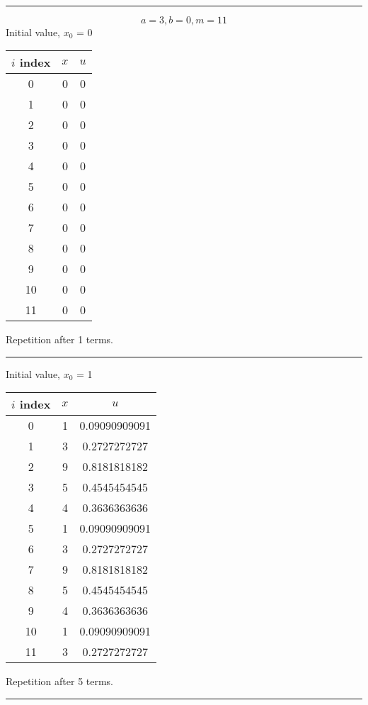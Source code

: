 \documentclass{article}
\begin{document}
\\ \noindent\rule[0.5ex]{\linewidth}{1pt}
\pagebreak
$$a = 3, b = 0, m = 11$$
Initial value, $x_0$ = 0
\begin{center} \begin{tabular}{||c | c | c||}  \hline
		$i$ index & $x$ & $u$ \\ [0.5ex] \hline \hline0 & 0 & 0\\
		\hline 
		1 & 0 & 0\\
		\hline 
		2 & 0 & 0\\
		\hline 
		3 & 0 & 0\\
		\hline 
		4 & 0 & 0\\
		\hline 
		5 & 0 & 0\\
		\hline 
		6 & 0 & 0\\
		\hline 
		7 & 0 & 0\\
		\hline 
		8 & 0 & 0\\
		\hline 
		9 & 0 & 0\\
		\hline 
		10 & 0 & 0\\
		\hline 
		11 & 0 & 0\\
		\hline 
	\end{tabular} 
\end{center} Repetition after 1 terms.
\\ \noindent\rule[0.5ex]{\linewidth}{1pt}
Initial value, $x_0$ = 1
\begin{center} \begin{tabular}{||c | c | c||}  \hline
		$i$ index & $x$ & $u$ \\ [0.5ex] \hline \hline0 & 1 & 0.09090909091\\
		\hline 
		1 & 3 & 0.2727272727\\
		\hline 
		2 & 9 & 0.8181818182\\
		\hline 
		3 & 5 & 0.4545454545\\
		\hline 
		4 & 4 & 0.3636363636\\
		\hline 
		5 & 1 & 0.09090909091\\
		\hline 
		6 & 3 & 0.2727272727\\
		\hline 
		7 & 9 & 0.8181818182\\
		\hline 
		8 & 5 & 0.4545454545\\
		\hline 
		9 & 4 & 0.3636363636\\
		\hline 
		10 & 1 & 0.09090909091\\
		\hline 
		11 & 3 & 0.2727272727\\
		\hline 
	\end{tabular} 
\end{center} Repetition after 5 terms.
\\ \noindent\rule[0.5ex]{\linewidth}{1pt}
\pagebreak
\end{document}
